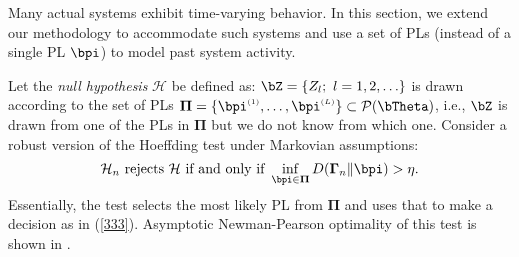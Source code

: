 \documentclass[10pt, twocolumn]{IEEEtran}
\begin{document}
Many actual systems exhibit time-varying behavior. In this section, we
extend our methodology to accommodate such systems and use a set of PLs
(instead of a single PL $\bpi$) to model past system activity.

Let the \textit{null hypothesis} $\mathcal{H}$ be defined as: $\bZ = \{
{{Z_l};~l = 1,2, \ldots } \}$ is drawn according to the set of PLs
$\boldsymbol{\Pi} = \{\bpi^{\scriptscriptstyle{(1)}}, \ldots,
\bpi^{\scriptscriptstyle{(L)}}\} \subset
\mathcal{P}({\bTheta})$, i.e., $\bZ$ is drawn from one of the
PLs in $\boldsymbol{\Pi}$ but we do not know from which one. Consider a
robust version of the Hoeffding test
\cite{robust-anomaly-tcns,TIT13,pandit2006worst} under Markovian
assumptions:
\begin{equation} {{\cal{H}}_n}{\text{ rejects }}{\cal{H}}{\text{ if and
      only if }}\mathop {\inf }_{\bpi \in \boldsymbol{\Pi} } D(
  {{\boldsymbol{\Gamma} _n}\| \bpi } ) > {\eta}. \label{robust-ht}
\end{equation}
Essentially, the test selects the most likely PL from $\boldsymbol{\Pi}$
and uses that to make a decision as in (\ref{333}). Asymptotic
Newman-Pearson optimality of this test is shown in
\cite{robust-anomaly-tcns}.
\end{document}
